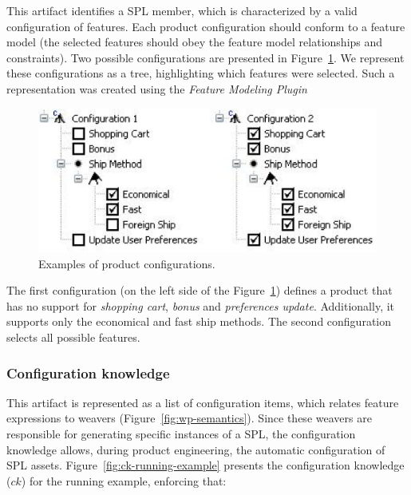 \documentclass{acm_proc_article-sp}
\begin{document}
This artifact identifies a SPL member, which is characterized by a valid
configuration of features. Each product configuration should conform to a
feature model (the selected features should obey the feature model relationships and constraints). Two possible configurations are presented in
Figure~\ref{fig:product-config-01-02}. We represent these configurations as a
tree, highlighting which features were selected. Such a representation was
created using the \emph{Feature Modeling Plugin}~\cite{czarnecki-eclipse-2004}

 \begin{figure}[h]
 \begin{center}
  \includegraphics[scale=0.40]{img/pc-03.eps}
   \caption{Examples of product configurations.}
  \label{fig:product-config-01-02}
  \end{center}
\end{figure}

  
The first configuration (on the left side of the
Figure~\ref{fig:product-config-01-02}) defines a product that has no support for
\emph{shopping cart}, \emph{bonus} and \emph{preferences update}. Additionally,
it supports only the economical and fast ship methods. The second configuration
selects all possible features. 

\subsubsection{Configuration knowledge}

This artifact is represented as a list of configuration items, which relates
feature expressions to weavers (Figure~\ref{fig:wp-semantics}). Since these
weavers are responsible for generating specific instances of a SPL,
the configuration knowledge allows, during product engineering, the automatic
configuration of SPL assets. Figure~\ref{fig:ck-running-example} presents the
configuration knowledge ($ck$) for the running example, enforcing that:
\end{document}
